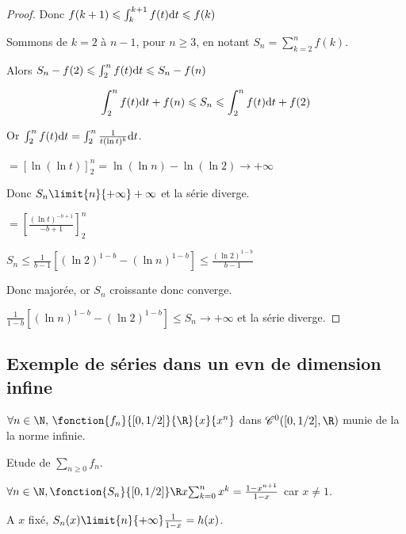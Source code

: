 \begin{proof}
    Donc $f(k + 1) \leqslant \int_{k}^{k + 1} f(t) \text d t \leqslant f(k)$

    Sommons de $k = 2$ à $n - 1$, pour $n \geqslant 3$, en notant $\displaystyle S_n = \sum_{k = 2}^{n} f(k)$. 

    Alors $S_n - f(2) \leqslant \int_{2}^{n} f(t) \text d t \leqslant S_n - f(n)$

    $$ \int_{2}^{n} f(t) \text d t + f(n) \leqslant S_n \leqslant \int_{2}^{n} f(t) \text d t + f(2)$$

    Or $\int_{2}^{n} f(t) \text d t = \int_{2}^{n} \frac 1 {t (\ln t)^b} \text d t$.

    \qquad {}

    $ = \left[ \ln(\ln t) \right]_{2}^{n} = \ln(\ln n) - \ln(\ln 2) \longrightarrow + \infty$

    Donc $S_n \limit{n}{+ \infty} + \infty$ et la série diverge.

    \qquad {}

    $ = \left[ \frac{(\ln t)^{-b + 1}}{-b + 1} \right]_{2}^{n}$ 

    \qquad {}

    $S_n \leqslant \frac 1 {b - 1} \left[ (\ln 2)^{1 - b} - (\ln n)^{1 - b} \right] \leqslant \frac{(\ln 2)^{1 - b}}{b - 1}$

    Donc majorée, or $S_n$ croissante donc converge.

    \qquad {}

    $\frac 1 {1 - b} \left[ (\ln n)^{1 - b} - (\ln 2)^{1 - b} \right] \leqslant S_n \longrightarrow + \infty$
    et la série diverge. 

\end{proof}


\subsection{Exemple de séries dans un evn de dimension infine }


$\forall n \in \N, \, \fonction{f_n}{[0, 1 / 2]}{\R}{x}{x^n}$ dans $\mathscr C^0([0, 1 / 2], \R)$ 
munie de la la norme infinie. 


Etude de $\sum_{n \geqslant 0} f_n$.

\avspace $\forall n \in \N, \fonction{S_n}{[0, 1 / 2]} \R x {\sum_{k = 0}^n x^k = \frac{1 - x^{n + 1}}{1 - x}}$ car $x \neq 1$. 

\avspace A $x$ fixé, $S_n(x) \limit{n}{+ \infty} \frac 1 {1 - x} = h(x)$.

